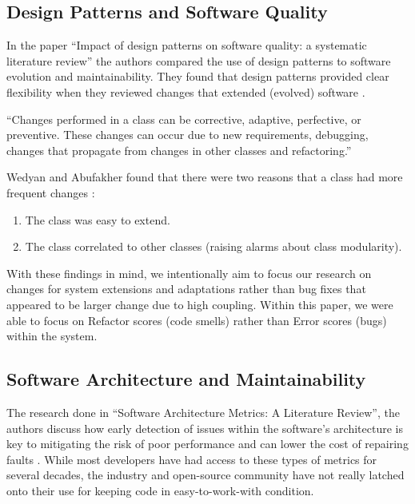 \subsection{Design Patterns and Software Quality}

In the paper ``Impact of design patterns on software quality: a systematic literature review'' the authors compared the use of design patterns to software evolution and maintainability. They found that design patterns provided clear flexibility when they reviewed changes that extended (evolved) software \cite{wedyan:2020}.

\vspace{0.25cm}
\begin{displayquote}
  ``Changes performed in a class can be corrective, adaptive, perfective, or preventive. These changes can occur due to new requirements, debugging, changes that propagate from changes in other classes and refactoring.''
\end{displayquote}
\vspace{0.25cm}

Wedyan and Abufakher found that there were two reasons that a class had more frequent changes \cite{wedyan:2020}:

\vspace{0.25cm}
\begin{enumerate}
    \item The class was easy to extend.
    \item The class correlated to other classes (raising alarms about class modularity).
\end{enumerate}
\vspace{0.25cm}

With these findings in mind, we intentionally aim to focus our research on changes for system extensions and adaptations rather than bug fixes that appeared to be larger change due to high coupling. Within this paper, we were able to focus on Refactor scores (code smells) rather than Error scores (bugs) within the system.

\subsection{Software Architecture and Maintainability}

The research done in ``Software Architecture Metrics: A Literature Review'', the authors discuss how early detection of issues within the software's architecture is key to mitigating the risk of poor performance and can lower the cost of repairing faults \cite{coulin:2019}. While most developers have had access to these types of metrics for several decades, the industry and open-source community have not really latched onto their use for keeping code in easy-to-work-with condition.

